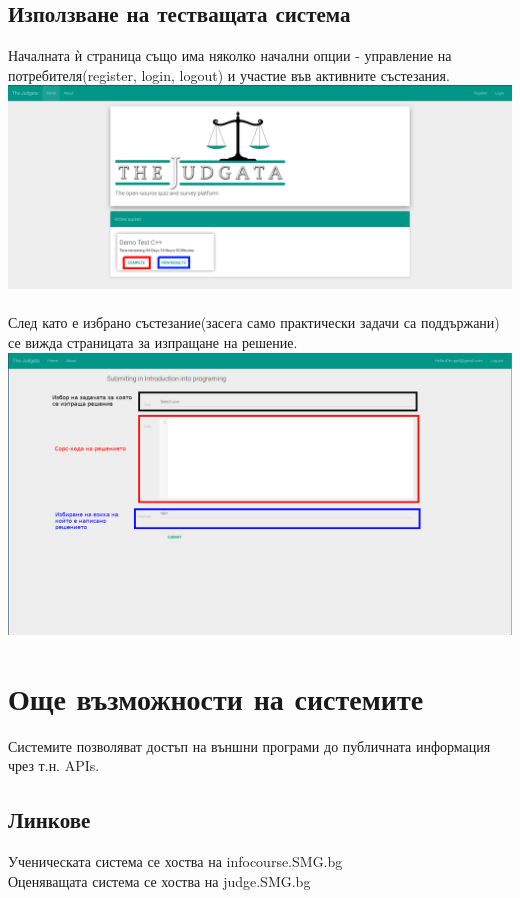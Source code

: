 \documentclass[12pt]{article}
\begin{document}
	\subsection{Използване на тестващата система}
	Началната ѝ страница също има няколко начални опции - управление на потребителя(register, login, logout) и участие във активните състезания.\\
  \includegraphics[width=1\textwidth]{judge_home.png}\\
	\\След като е избрано състезание(засега само практически задачи са поддържани) се вижда страницата за изпращане на решение.\\
	\includegraphics[width=1\textwidth]{judge_submi.png}\\
	\section{Още възможности на системите}
	Системите позволяват достъп на външни програми до публичната информация чрез т.н. APIs.
	\subsection{Линкове}
	Ученическата система се хоства на infocourse.SMG.bg \\
	Оценяващата система се хоства на judge.SMG.bg
\end{document}
